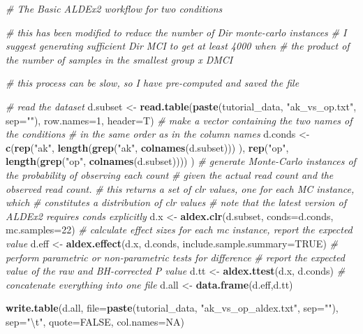 \documentclass[onecolumn]{book}
\newenvironment{Shaded}{\begin{snugshade}}{\end{snugshade}}
\newcommand{\CharTok}[1]{\textcolor[rgb]{0.31,0.60,0.02}{#1}}
\newcommand{\CommentTok}[1]{\textcolor[rgb]{0.56,0.35,0.01}{\textit{#1}}}
\newcommand{\DataTypeTok}[1]{\textcolor[rgb]{0.13,0.29,0.53}{#1}}
\newcommand{\DecValTok}[1]{\textcolor[rgb]{0.00,0.00,0.81}{#1}}
\newcommand{\KeywordTok}[1]{\textcolor[rgb]{0.13,0.29,0.53}{\textbf{#1}}}
\newcommand{\NormalTok}[1]{#1}
\newcommand{\OtherTok}[1]{\textcolor[rgb]{0.56,0.35,0.01}{#1}}
\newcommand{\StringTok}[1]{\textcolor[rgb]{0.31,0.60,0.02}{#1}}
\theoremstyle{definition}
\theoremstyle{definition}
\theoremstyle{definition}
\theoremstyle{remark}
\begin{document}
\begin{Shaded}
\begin{Highlighting}[]
\CommentTok{# The Basic ALDEx2 workflow for two conditions}

\CommentTok{# this has been modified to reduce the number of Dir monte-carlo instances}
\CommentTok{# I suggest generating sufficient Dir MCI to get at least 4000 when}
\CommentTok{# the product of the number of samples in the smallest group x DMCI}

\CommentTok{# this process can be slow, so I have pre-computed and saved the file}


\CommentTok{# read the dataset}
\NormalTok{d.subset <-}\StringTok{ }\KeywordTok{read.table}\NormalTok{(}\KeywordTok{paste}\NormalTok{(tutorial_data, }\StringTok{"ak_vs_op.txt"}\NormalTok{, }\DataTypeTok{sep=}\StringTok{""}\NormalTok{),}
    \DataTypeTok{row.names=}\DecValTok{1}\NormalTok{, }\DataTypeTok{header=}\NormalTok{T)}
\CommentTok{# make a vector containing the two names of the conditions}
\CommentTok{# in the same order as in the column names}
\NormalTok{d.conds <-}\StringTok{ }\KeywordTok{c}\NormalTok{(}\KeywordTok{rep}\NormalTok{(}\StringTok{"ak"}\NormalTok{, }\KeywordTok{length}\NormalTok{(}\KeywordTok{grep}\NormalTok{(}\StringTok{"ak"}\NormalTok{, }\KeywordTok{colnames}\NormalTok{(d.subset))) ),}
    \KeywordTok{rep}\NormalTok{(}\StringTok{"op"}\NormalTok{, }\KeywordTok{length}\NormalTok{(}\KeywordTok{grep}\NormalTok{(}\StringTok{"op"}\NormalTok{, }\KeywordTok{colnames}\NormalTok{(d.subset)))) )}
\CommentTok{# generate Monte-Carlo instances of the probability of observing each count}
\CommentTok{# given the actual read count and the observed read count.}
\CommentTok{# this returns a set of clr values, one for each MC instance, which}
\CommentTok{# constitutes a distribution of clr values}
\CommentTok{# note that the latest version of ALDEx2 requires conds explicitly}
\NormalTok{d.x <-}\StringTok{ }\KeywordTok{aldex.clr}\NormalTok{(d.subset, }\DataTypeTok{conds=}\NormalTok{d.conds, }\DataTypeTok{mc.samples=}\DecValTok{22}\NormalTok{)}
\CommentTok{# calculate effect sizes for each mc instance, report the expected value}
\NormalTok{d.eff <-}\StringTok{ }\KeywordTok{aldex.effect}\NormalTok{(d.x, d.conds, }\DataTypeTok{include.sample.summary=}\OtherTok{TRUE}\NormalTok{)}
\CommentTok{# perform parametric or non-parametric tests for difference}
\CommentTok{# report the expected value of the raw and BH-corrected P value}
\NormalTok{d.tt <-}\StringTok{ }\KeywordTok{aldex.ttest}\NormalTok{(d.x, d.conds)}
\CommentTok{# concatenate everything into one file}
\NormalTok{d.all <-}\StringTok{ }\KeywordTok{data.frame}\NormalTok{(d.eff,d.tt)}

\KeywordTok{write.table}\NormalTok{(d.all, }\DataTypeTok{file=}\KeywordTok{paste}\NormalTok{(tutorial_data, }\StringTok{"ak_vs_op_aldex.txt"}\NormalTok{, }\DataTypeTok{sep=}\StringTok{""}\NormalTok{), }\DataTypeTok{sep=}\StringTok{"}\CharTok{\textbackslash{}t}\StringTok{"}\NormalTok{,}
    \DataTypeTok{quote=}\OtherTok{FALSE}\NormalTok{, }\DataTypeTok{col.names=}\OtherTok{NA}\NormalTok{)}
\end{Highlighting}
\end{Shaded}
\end{document}
